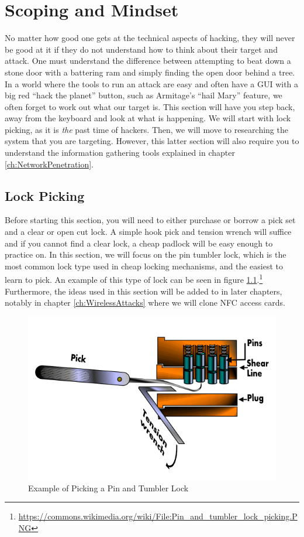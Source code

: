 \chapter{Scoping and Mindset}\label{ch:ScopingMindset}
		No matter how good one gets at the technical aspects of hacking, they will never be good at it if they do not understand how to think about their target and attack.
		One must understand the difference between attempting to beat down a stone door with a battering ram and simply finding the open door behind a tree.
		In a world where the tools to run an attack are easy and often have a GUI with a big red ``hack the planet'' button,
		such as Armitage's ``hail Mary'' feature, we often forget to work out what our target is.
		This section will have you step back, away from the keyboard and look at what is happening.
		We will start with lock picking, as it is \emph{the} past time of hackers.
		Then, we will move to researching the system that you are targeting.
		However, this latter section will also require you to understand the information gathering tools explained in chapter \ref{ch:NetworkPenetration}.
	\section{Lock Picking}
		Before starting this section, you will need to either purchase or borrow a pick set and a clear or open cut lock.
		A simple hook pick and tension wrench will suffice and if you cannot find a clear lock, a cheap padlock will be easy enough to practice on.
		In this section, we will focus on the pin tumbler lock, which is the most common lock type used in cheap locking mechanisms, and the easiest to learn to pick.
		An example of this type of lock can be seen in figure \ref{fig:PinTumblerLock}.\footnote{\url{https://commons.wikimedia.org/wiki/File:Pin\_and\_tumbler\_lock\_picking.PNG}}
		Furthermore, the ideas used in this section will be added to in later chapters, notably in chapter \ref{ch:WirelessAttacks} where we will clone NFC access cards.
		\begin{figure}[htb]
			\centering
			\includegraphics[scale=0.6]{./PinTumblerLock.png}
			\caption{Example of Picking a Pin and Tumbler Lock}
			\label{fig:PinTumblerLock}
		\end{figure}
